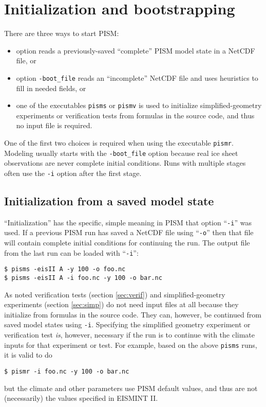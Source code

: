 
\section{Initialization and bootstrapping}
\label{sec:initboot}

There are three ways to start PISM:\begin{itemize}
\item option  reads a previously-saved ``complete'' PISM model state in a NetCDF file, or
\item option \texttt{-boot_file} reads an ``incomplete'' NetCDF file and uses heuristics to fill in needed fields, or
\item one of the executables \texttt{pisms} or \texttt{pismv} is used to initialize simplified-geometry experiments or verification tests from formulas in the source code, and thus no input file is required.
\end{itemize}
One of the first two choices is required when using the executable \texttt{pismr}.  Modeling usually starts with the \texttt{-boot_file} option because real ice sheet observations are never complete initial conditions.  Runs with multiple stages often use the \texttt{-i} option after the first stage.

\subsection{Initialization from a saved model state}  ``Initialization'' has the specific, simple meaning in PISM that option ``\texttt{-i}'' was used.  If a previous PISM run has saved a NetCDF file using ``\texttt{-o}'' then that file will contain complete initial conditions for continuing the run.  The output file from the last run can be loaded with ``\texttt{-i}'': 

\begin{verbatim}
$ pisms -eisII A -y 100 -o foo.nc
$ pisms -eisII A -i foo.nc -y 100 -o bar.nc
\end{verbatim}
\smallskip

As noted verification tests (section \ref{sec:verif}) and simplified-geometry experiments (section \ref{sec:simp}) do not need input files at all because they initialize from formulas in the source code.  They can, however, be continued from saved model states using \texttt{-i}.  Specifying the simplified geometry experiment or verification test \emph{is}, however, necessary if the run is to continue with the climate inputs for that experiment or test.  For example, based on the above \texttt{pisms} runs, it is valid to do
\begin{verbatim}
$ pismr -i foo.nc -y 100 -o bar.nc
\end{verbatim}
but the climate and other parameters use PISM default values, and thus are not (necessarily) the values specified in EISMINT II.

